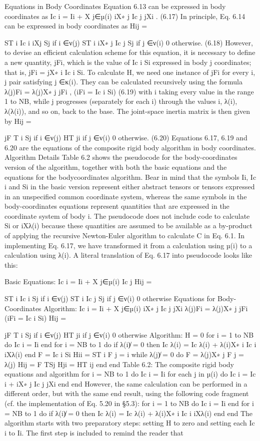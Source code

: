 Equations in Body Coordinates Equation 6.13 can be expressed in body coordinates as Ic i = Ii + X j∈µ(i) iX∗ j Ic j jXi . (6.17) In principle, Eq. 6.14 can be expressed in body coordinates as Hij =

ST i Ic i iXj Sj if i ∈ν(j) ST i iX∗ j Ic j Sj if j ∈ν(i) 0 otherwise. (6.18) However, to devise an efficient calculation scheme for this equation, it is necessary to define a new quantity, jFi, which is the value of Ic i Si expressed in body j coordinates; that is, jFi = jX∗ i Ic i Si. To calculate H, we need one instance of jFi for every i, j pair satisfying j ∈κ(i). They can be calculated recursively using the formula λ(j)Fi = λ(j)X∗ j jFi , (iFi = Ic i Si) (6.19) with i taking every value in the range 1 to NB, while j progresses (separately for each i) through the values i, λ(i), λ(λ(i)), and so on, back to the base. The joint-space inertia matrix is then given by Hij =

jF T i Sj if i ∈ν(j) HT ji if j ∈ν(i) 0 otherwise. (6.20) Equations 6.17, 6.19 and 6.20 are the equations of the composite rigid body algorithm in body coordinates. Algorithm Details Table 6.2 shows the pseudocode for the body-coordinates version of the algorithm, together with both the basic equations and the equations for the bodycoordinates algorithm. Bear in mind that the symbols Ii, Ic i and Si in the basic version represent either abstract tensors or tensors expressed in an unspecified common coordinate system, whereas the same symbols in the body-coordinates equations represent quantities that are expressed in the coordinate system of body i. The pseudocode does not include code to calculate Si or iXλ(i) because these quantities are assumed to be available as a by-product of applying the recursive Newton-Euler algorithm to calculate C in Eq. 6.1. In implementing Eq. 6.17, we have transformed it from a calculation using µ(i) to a calculation using λ(i). A literal translation of Eq. 6.17 into pseudocode looks like this:

Basic Equations: Ic i = Ii + X j∈µ(i) Ic j Hij =

ST i Ic i Sj if i ∈ν(j) ST i Ic j Sj if j ∈ν(i) 0 otherwise Equations for Body-Coordinates Algorithm: Ic i = Ii + X j∈µ(i) iX∗ j Ic j jXi λ(j)Fi = λ(j)X∗ j jFi (iFi = Ic i Si) Hij =

jF T i Sj if i ∈ν(j) HT ji if j ∈ν(i) 0 otherwise Algorithm: H = 0 for i = 1 to NB do Ic i = Ii end for i = NB to 1 do if λ(i)̸ = 0 then Ic λ(i) = Ic λ(i) + λ(i)X∗ i Ic i iXλ(i) end F = Ic i Si Hii = ST i F j = i while λ(j)̸ = 0 do F = λ(j)X∗ j F j = λ(j) Hij = F TSj Hji = HT ij end end Table 6.2: The composite rigid body equations and algorithm for i = NB to 1 do Ic i = Ii for each j in µ(i) do Ic i = Ic i + iX∗ j Ic j jXi end end However, the same calculation can be performed in a different order, but with the same end result, using the following code fragment (cf. the implementation of Eq. 5.20 in §5.3): for i = 1 to NB do Ic i = Ii end for i = NB to 1 do if λ(i)̸ = 0 then Ic λ(i) = Ic λ(i) + λ(i)X∗ i Ic i iXλ(i) end end The algorithm starts with two preparatory steps: setting H to zero and setting each Ic i to Ii. The first step is included to remind the reader that

